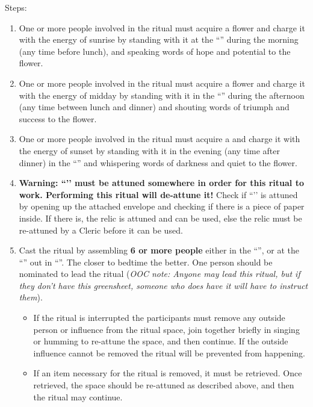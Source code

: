 \documentclass[green]{GL2020}
\begin{document}
Steps:
\begin{enumerate}
  \item One or more people involved in the ritual must acquire a \iMorningGlory{} flower and charge it with the energy of sunrise by standing with it at the ``\pGarden{}'' during the morning (any time before lunch), and speaking words of hope and potential to the flower. 
  \item One or more people involved in the ritual must acquire a \iLily{} flower and charge it with the energy of midday by standing with it in the ``\pTrainingField{}'' during the afternoon (any time between lunch and dinner) and shouting words of triumph and success to the flower.
  \item One or more people involved in the ritual must acquire a \iMoonflower{} and charge it with the energy of sunset by standing with it in the evening (any time after dinner)  in the ``\pGraveyard{}'' and whispering words of darkness and quiet to the flower.
  \item \textbf{Warning: ``\iMirror{}’’ must be attuned somewhere in order for this ritual to work. Performing this ritual will de-attune it!} Check if ``\iMirror{}’’ is attuned by opening up the attached envelope and checking if there is a piece of paper inside. If there is, the relic is attuned and can be used, else the relic must be re-attuned by a Cleric before it can be used.
  \item Cast the ritual by assembling \textbf{6 or more people} either in the ``\pStudentLoungeBunker{}'', or at the ``\sMemorialToFallenStudents{}'' out in ``\pGraveyard{}''. The closer to bedtime the better. One person should be nominated to lead the ritual (\emph{OOC note: Anyone may lead this ritual, but if they don't have this greensheet, someone who does have it will have to instruct them}). 
  \begin{itemize}
  \item  If the ritual is interrupted the participants must remove any outside person or influence from the ritual space, join together briefly in singing or humming to re-attune the space, and then continue. If the outside influence cannot be removed the ritual will be prevented from happening.
  \item If an item necessary for the ritual is removed, it must be retrieved. Once retrieved, the space should be re-attuned as described above, and then the ritual may continue.


\end{itemize}
\end{enumerate}
\end{document}
